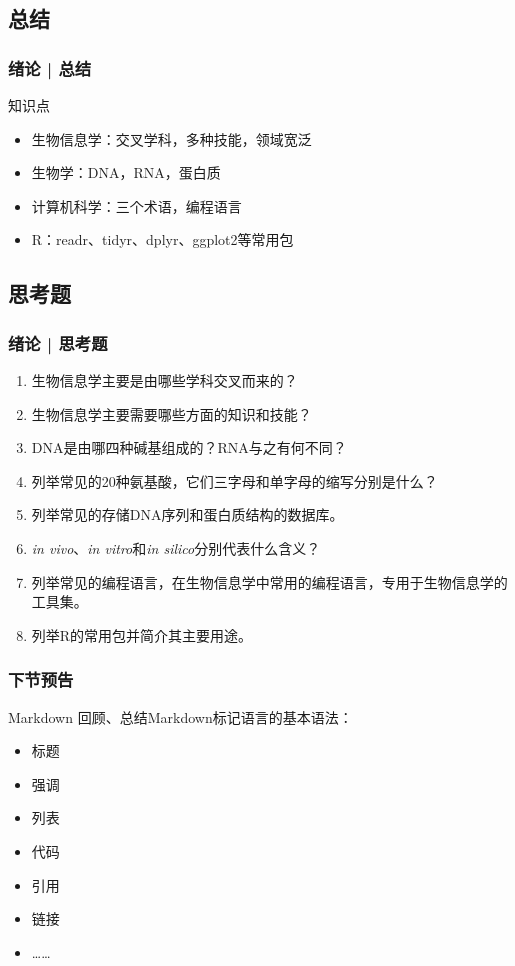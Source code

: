\subsection{总结}
\begin{frame}
  \frametitle{绪论 | 总结}
  \begin{block}{知识点}
    \begin{itemize}
      \item 生物信息学：交叉学科，多种技能，领域宽泛
      \item 生物学：DNA，RNA，蛋白质
      \item 计算机科学：三个术语，编程语言
      \item R：readr、tidyr、dplyr、ggplot2等常用包
    \end{itemize}
  \end{block}
\end{frame}

\subsection{思考题}
\begin{frame}
  \frametitle{绪论 | 思考题}
  \begin{enumerate}
    \item 生物信息学主要是由哪些学科交叉而来的？
    \item 生物信息学主要需要哪些方面的知识和技能？
    \item DNA是由哪四种碱基组成的？RNA与之有何不同？
    \item 列举常见的20种氨基酸，它们三字母和单字母的缩写分别是什么？
    \item 列举常见的存储DNA序列和蛋白质结构的数据库。
    \item \textit{in vivo}、\textit{in vitro}和\textit{in silico}分别代表什么含义？
    \item 列举常见的编程语言，在生物信息学中常用的编程语言，专用于生物信息学的工具集。
    \item 列举R的常用包并简介其主要用途。
  \end{enumerate}
\end{frame}

\begin{frame}
  \frametitle{下节预告}
  \begin{block}{Markdown}
    回顾、总结Markdown标记语言的基本语法：
    \begin{itemize}
      \item 标题
      \item 强调
      \item 列表
      \item 代码
      \item 引用
      \item 链接
      \item ……
    \end{itemize}
  \end{block}
\end{frame}


